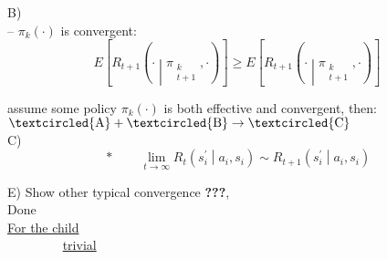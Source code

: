 B)\\
\boxed{$\textasteriskcentered$} -- $\pi_k(\cdot)$ is convergent:
\begin{equation*}
E\left[ R_{t+1}\left( \cdot \middle| \pi_{\substack{k\\t+1}},\cdot\right)\right] \ge E\left[ R_{t+1}\left( \cdot \middle| \pi_{\substack{k\\t+1}},\cdot\right)\right]
\end{equation*}

 assume some policy $\pi_k(\cdot)$ is both effective and convergent, then:\\
$\textcircled{\text{A}}+\textcircled{\text{B}}\rightarrow\textcircled{\text{C}}$\\

C)\\

\begin{equation*}
\boxed{\ast}\qquad \lim_{t\rightarrow\infty} R_t\left( s^\prime_i \middle| a_i, s_i \right) \sim R_{t+1}\left( s^\prime_i \middle| a_i, s_i \right)
\end{equation*}

E) Show other typical convergence \textbf{???},\\

Done\\

\underline{For the child}\\

\boxed{$\textasteriskcentered$}$\qquad\qquad$ \underline{trivial}


